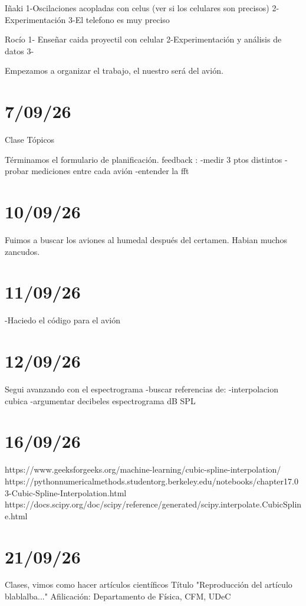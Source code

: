 \documentclass{article}
\begin{document}
Iñaki
1-Oscilaciones acopladas con celus (ver si los celulares son precisos)
2-Experimentación
3-El telefono es muy preciso

Rocío
1- Enseñar caida proyectil con celular
2-Experimentación y análisis de datos
3- 


Empezamos a organizar el trabajo, el nuestro será del avión.


\section{7/09/26}

Clase Tópicos

Términamos el formulario de planificación.
feedback :
-medir 3 ptos distintos
-probar mediciones entre cada avión
-entender la fft


\section{10/09/26}
Fuimos a buscar los aviones al humedal después del certamen. Habian muchos zancudos.


\section{11/09/26}

-Haciedo el código para el avión




\section{12/09/26}
Segui avanzando con el espectrograma
-buscar referencias de: -interpolacion cubica
-argumentar decibeles espectrograma
dB SPL


\section{16/09/26}

https://www.geeksforgeeks.org/machine-learning/cubic-spline-interpolation/
https://pythonnumericalmethods.studentorg.berkeley.edu/notebooks/chapter17.03-Cubic-Spline-Interpolation.html
https://docs.scipy.org/doc/scipy/reference/generated/scipy.interpolate.CubicSpline.html


\section{21/09/26}

Clases, vimos como hacer artículos científicos
Título "Reproducción del artículo blablalba..."
Afilicación: Departamento de Física, CFM, UDeC
\end{document}

